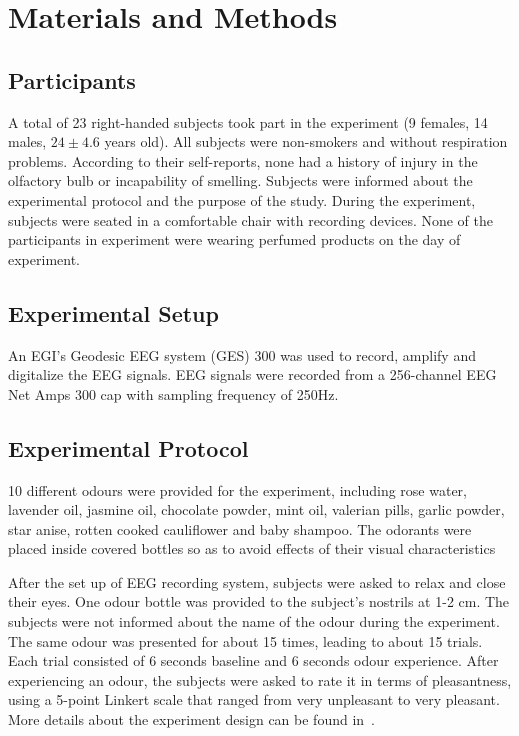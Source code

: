 \section{Materials and Methods}

\subsection{Participants}
A total of 23 right-handed subjects took part in the experiment (9 females, 14 males, $24 \pm 4.6$ years old). All subjects were non-smokers and without respiration problems. According to their self-reports, none had a history of injury in the olfactory bulb or incapability of smelling. Subjects were informed about the experimental protocol and the purpose of the study. During the experiment, subjects were seated in a comfortable chair with recording devices. None of the participants in experiment were wearing perfumed products on the day of experiment. 

\subsection{Experimental Setup}
An EGI's Geodesic EEG system (GES) 300 was used to record, amplify and digitalize the EEG signals. EEG signals were recorded from a 256-channel EEG Net Amps 300 cap with sampling frequency of 250Hz.  

\subsection{Experimental Protocol}
10 different odours were provided for the experiment, including rose water, lavender oil, jasmine oil, chocolate powder, mint oil, valerian pills, garlic powder, star anise, rotten cooked cauliflower and baby shampoo. The odorants were placed inside covered bottles so as to avoid effects of their visual characteristics

After the set up of EEG recording system, subjects were asked to relax and close their eyes. One odour bottle was provided to the subject's nostrils at 1-2 cm. The subjects were not informed about the name of the odour during the experiment. The same odour was presented for about 15 times, leading to about 15 trials. Each trial consisted of 6 seconds baseline and 6 seconds odour experience. After experiencing an odour, the subjects were asked to rate it in terms of pleasantness, using a 5-point Linkert scale that ranged from very unpleasant to very pleasant. More details about the experiment design can be found in~\cite{kroupi2014non}.     

